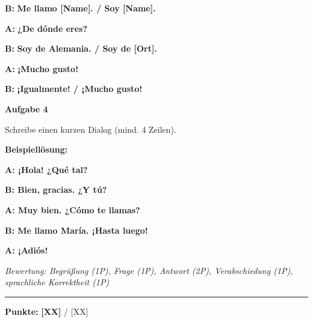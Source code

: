 \documentclass[11pt, a4paper]{article}
\newcommand{\fachfarbe}{spanisch}
\newcommand{\maxpunkte}{[XX]}
\newcommand{\punktebox}[1]{\hfill\fbox{\small \_/#1}}
\newcommand{\loesung}[1]{\textcolor{loesung}{\textbf{#1}}}
\newenvironment{aufgabe}[1]{%
    \needspace{5\baselineskip}%
    \nopagebreak[4]%
    \vspace{10pt}
    \noindent\textbf{\textcolor{\fachfarbe}{Aufgabe #1}}
    \nopagebreak[4]%
    \vspace{5pt}
    \nopagebreak[4]%
    \begin{list}{}{\leftmargin=0pt}
    \item[]
}{%
    \end{list}
}
\newcommand{\es}[1]{\textcolor{\fachfarbe}{\textbf{#1}}}
\begin{document}
\textbf{B:} \loesung{Me llamo [Name]. / Soy [Name].}

\textbf{A:} \es{¿De dónde eres?}

\textbf{B:} \loesung{Soy de Alemania. / Soy de [Ort].}

\textbf{A:} \es{¡Mucho gusto!}

\textbf{B:} \loesung{¡Igualmente! / ¡Mucho gusto!}

\vspace{15pt}


\begin{aufgabe}{4}
Schreibe einen kurzen Dialog (mind. 4 Zeilen). \punktebox{6}
\end{aufgabe}

\textbf{Beispiellösung:}

\loesung{A: ¡Hola! ¿Qué tal?}

\loesung{B: Bien, gracias. ¿Y tú?}

\loesung{A: Muy bien. ¿Cómo te llamas?}

\loesung{B: Me llamo María. ¡Hasta luego!}

\loesung{A: ¡Adiós!}

\vspace{0.5em}
\textit{\textcolor{grau}{Bewertung: Begrüßung (1P), Frage (1P), Antwort (2P), Verabschiedung (1P), sprachliche Korrektheit (1P)}}


\vspace{20pt}
\hrule
\vspace{10pt}

\begin{flushright}
\textbf{Punkte:} \loesung{\maxpunkte} / \maxpunkte
\end{flushright}
\end{document}
